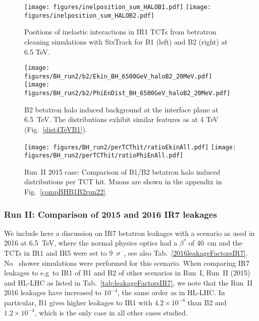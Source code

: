 \begin{figure}[!htb]
\begin{center}
\texttt{[image: figures/inelposition\_sum\_HALOB1.pdf]}
\texttt{[image: figures/inelposition\_sum\_HALOB2.pdf]}
\end{center}
 \caption{Positions of inelastic interactions in IR1 TCTs from betratron cleaning simulations with SixTrack for B1 (left) and B2 (right) at 6.5 TeV.
  \label{inel6.5}}
\end{figure}


\begin{figure}%
\centering
\texttt{[image: figures/BH\_run2/b2/Ekin\_BH\_6500GeV\_haloB2\_20MeV.pdf]}
\texttt{[image: figures/BH\_run2/b2/PhiEnDist\_BH\_6500GeV\_haloB2\_20MeV.pdf]}
 \caption{B2 betatron halo induced background at the interface plane at 6.5~TeV. The distributions exhibit similar features as at 4 TeV (Fig.~\ref{dist4TeVB1}).
  \label{dist6500GeVB2}}
\end{figure}


\begin{figure}%
\centering
  \texttt{[image: figures/BH\_run2/perTCThit/ratioEkinAll.pdf]}
  \texttt{[image: figures/BH\_run2/perTCThit/ratioPhiEnAll.pdf]}
 \caption{Run~II 2015 case: Comparison of B1/B2 betatron halo induced distributions per TCT hit. Muons are shown in the appendix in Fig.~\ref{compBHB1B2run22}.
  \label{compBHB1B2run2}}
\end{figure}

\subsubsection{Run II: Comparison of 2015 and 2016 IR7 leakages}

We include here a discussion on IR7 betatron leakages with a scenario as used in 2016 at 6.5~TeV, where the normal physics optics had a $\beta^*$ of 40~cm and the TCTs in IR1 and IR5 were set to 9~$\sigma$~\cite{bruceEvian2015}, see also Tab.~\ref{2016leakageFactorsIR7}. No \fluka~shower simulations were performed for this scenario. When comparing IR7 leakages to e.g~to IR1 of B1 and B2 of other scenarios in Run~I, Run~II (2015) and HL-LHC as listed in Tab.~\ref{tab:leakageFactorsIR7}, we note that the Run~II 2016 leakages have increased to $10^{-4}$, the same order as in HL-LHC. In particular, B1 gives higher leakages to IR1 with $4.2 \times 10^{-4}$ than B2 and $1.2 \times 10^{-4}$, which is the only case in all other cases studied.



